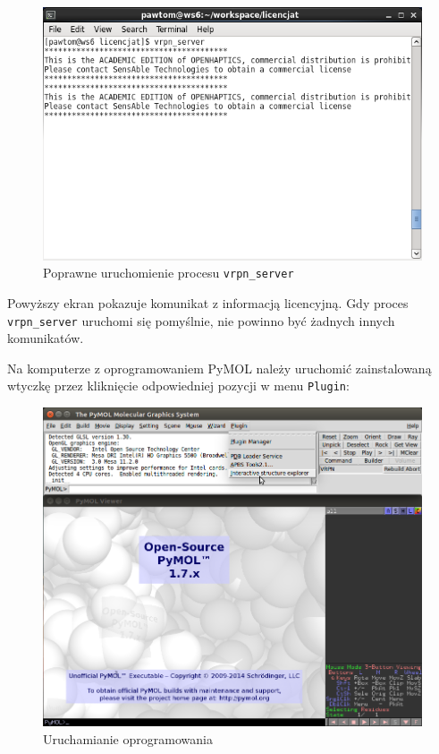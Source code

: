 \documentclass[licencjacka]{pracamgr}
\begin{document}
\begin{figure}[H]
\centering
\includegraphics[scale=0.8,center]{vrpn_start}
\caption{Poprawne uruchomienie procesu \texttt{vrpn\_server}}
\end{figure}

Powyższy ekran pokazuje komunikat z informacją licencyjną. Gdy proces \texttt{vrpn\_server} uruchomi się pomyślnie, nie powinno być żadnych innych komunikatów.

Na komputerze z oprogramowaniem PyMOL należy uruchomić zainstalowaną wtyczkę przez kliknięcie odpowiedniej pozycji w menu \texttt{Plugin}:

\begin{figure}[H]
\centering
\includegraphics[scale=0.5,center]{explorer_run}
\caption{Uruchamianie oprogramowania}
\end{figure}
\end{document}
